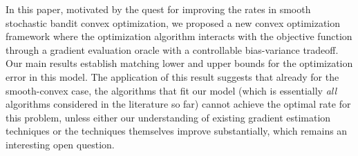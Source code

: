 

In this paper, motivated by the quest for improving the rates in smooth stochastic bandit convex optimization,
we proposed a new convex optimization framework where the optimization algorithm interacts with the objective function
through a gradient evaluation oracle with a controllable bias-variance tradeoff. Our main results establish matching lower and upper bounds for the optimization error in this model. The application of this result suggests that already for the smooth-convex case, the algorithms that fit our model (which is essentially \emph{all} algorithms considered in the literature so far) cannot achieve the optimal rate for this problem, unless either our understanding of existing gradient estimation techniques or the techniques themselves improve substantially, which remains an interesting open question.
